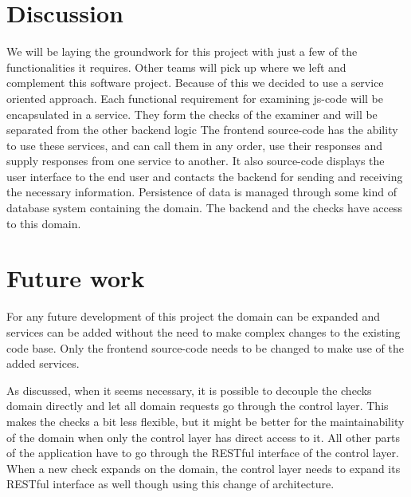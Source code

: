\section{Discussion}
We will be laying the groundwork for this project
with just a few of the functionalities it requires.
Other teams will pick up where we left and complement this software project.
Because of this we decided to use a service oriented approach.
Each functional requirement for examining \gls{js-code}
will be encapsulated in a service.
They form the \glspl{check} of the \gls{examiner}
and will be separated from the other backend logic
The frontend \gls{source-code} has the ability to use these services,
and can call them in any order, use their responses
and supply responses from one service to another.
It also \gls{source-code} displays the user interface to the end user
and contacts the backend for sending and receiving the necessary information.
Persistence of data is managed through some kind of database system
containing the domain.
The backend and the \glspl{check} have access to this domain.

\section{Future work}
For any future development of this project
the domain can be expanded
and services can be added
without the need to make complex changes to the existing code base.
Only the frontend \gls{source-code} needs to be changed
to make use of the added services.

As discussed, when it seems necessary,
it is possible to decouple the \glspl{check} domain directly
and let all domain requests go through the control layer.
This makes the \glspl{check} a bit less flexible,
but it might be better for the maintainability of the domain
when only the control layer has direct access to it.
All other parts of the application have to go through the RESTful interface
of the control layer.
When a new \gls{check} expands on the domain,
the control layer needs to expand its RESTful interface as well though
using this change of architecture.
